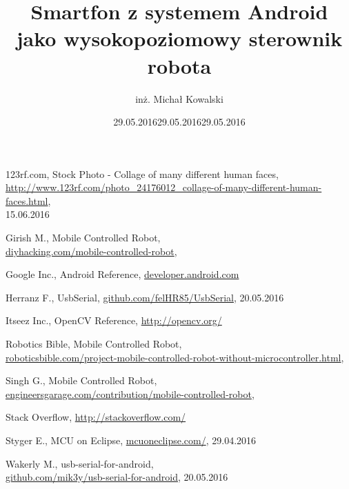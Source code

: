 \documentclass[]{mgr} %
\author{inż. Michał Kowalski}
\title{Smartfon z systemem Android\\jako wysokopoziomowy sterownik robota}
\begin{document}
\maketitle
\tableofcontents
\listoffigures











\begin{thebibliography}{99}

123rf.com, Stock Photo - Collage of many different human faces,\\
\url{http://www.123rf.com/photo_24176012_collage-of-many-different-human-faces.html},\\
15.06.2016



Girish M., Mobile Controlled Robot,\\
\url{diyhacking.com/mobile-controlled-robot},
\date{29.05.2016}

Google Inc., Android Reference,
\url{developer.android.com}

Herranz F., UsbSerial,
\url{github.com/felHR85/UsbSerial},
20.05.2016

Itseez Inc., OpenCV Reference,
\url{http://opencv.org/}

Robotics Bible, Mobile Controlled Robot,\\
\url{roboticsbible.com/project-mobile-controlled-robot-without-microcontroller.html},\\
\date{29.05.2016}

Singh G., Mobile Controlled Robot,\\
\url{engineersgarage.com/contribution/mobile-controlled-robot},
\date{29.05.2016}

Stack Overflow,
\url{http://stackoverflow.com/}

Styger E., MCU on Eclipse,
\url{mcuoneclipse.com/},
29.04.2016

Wakerly M., usb-serial-for-android,\\
\url{github.com/mik3y/usb-serial-for-android},
20.05.2016

\end{thebibliography}
\end{document}
